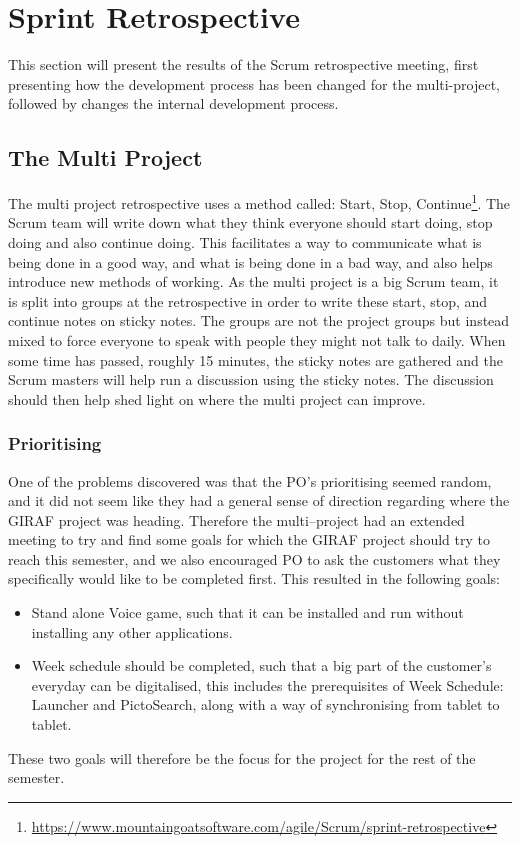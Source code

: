 \section{Sprint Retrospective}\label{s1retro}
This section will present the results of the Scrum retrospective meeting, first presenting how the development process has been changed for the multi-project, followed by changes the internal development process.

\subsection{The Multi Project}\label{retro1}
The multi project retrospective uses a method called: Start, Stop, Continue\footnote{\url{https://www.mountaingoatsoftware.com/agile/Scrum/sprint-retrospective}}.
The Scrum team will write down what they think everyone should start doing, stop doing and also continue doing.
This facilitates a way to communicate what is being done in a good way, and what is being done in a bad way, and also helps introduce new methods of working.
As the multi project is a big Scrum team, it is split into groups at the retrospective in order to write these start, stop, and continue notes on sticky notes.
The groups are not the project groups but instead mixed to force everyone to speak with people they might not talk to daily.
When some time has passed, roughly 15 minutes, the sticky notes are gathered and the Scrum masters will help run a discussion using the sticky notes.
The discussion should then help shed light on where the multi project can improve.

\subsubsection{Prioritising}
One of the problems discovered was that the PO's prioritising seemed random, and it did not seem like they had a general sense of direction regarding where the GIRAF project was heading.
Therefore the multi--project had an extended meeting to try and find some goals for which the GIRAF project should try to reach this semester, and we also encouraged PO to ask the customers what they specifically would like to be completed first.
This resulted in the following goals:
\begin{itemize}
	\item Stand alone Voice game, such that it can be installed and run without installing any other applications.
	\item Week schedule should be completed, such that a big part of the customer's everyday can be digitalised, this includes the prerequisites of Week Schedule: Launcher and PictoSearch, along with a way of synchronising from tablet to tablet.
\end{itemize}
These two goals will therefore be the focus for the project for the rest of the semester.

